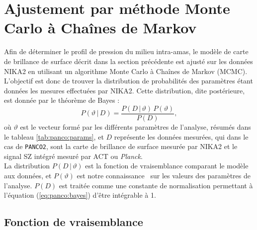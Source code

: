 \section{Ajustement par méthode Monte Carlo à Chaînes de Markov}
\label{sec:panco:fit}

Afin de déterminer le profil de pression du milieu intra-amas, le modèle de carte de brillance de surface décrit dans la section précédente est ajusté sur les données NIKA2 en utilisant un algorithme Monte Carlo à Chaînes de Markov (MCMC).
L'objectif est donc de trouver la distribution de probabilités des paramètres étant données les mesures effectuées par NIKA2.
Cette distribution, dite postérieure, est donnée par le théorème de Bayes :
\begin{equation}
    \label{eq:panco:bayes}
    P(\vartheta \,|\, D) = \frac{P(D \,|\, \vartheta) \, P(\vartheta)}{P(D)},
\end{equation}
où $\vartheta$ est le vecteur formé par les différents paramètres de l'analyse, résumés dans le tableau \ref{tab:panco:params}, et $D$ représente les données mesurées, qui dans le cas de \texttt{PANCO2}, sont la carte de brillance de surface mesurée par NIKA2 et le signal SZ intégré mesuré par ACT ou \textit{Planck}. \\
La distribution $P(D \,|\, \vartheta)$ est la fonction de vraisemblance comparant le modèle aux données, et $P(\vartheta)$ est notre connaissance \prior\ sur les valeurs des paramètres de l'analyse.
$P(D)$ est traitée comme une constante de normalisation permettant à l'équation (\ref{eq:panco:bayes}) d'être intégrable à 1.

\subsection{Fonction de vraisemblance} \label{sec:panco:likelihood}

